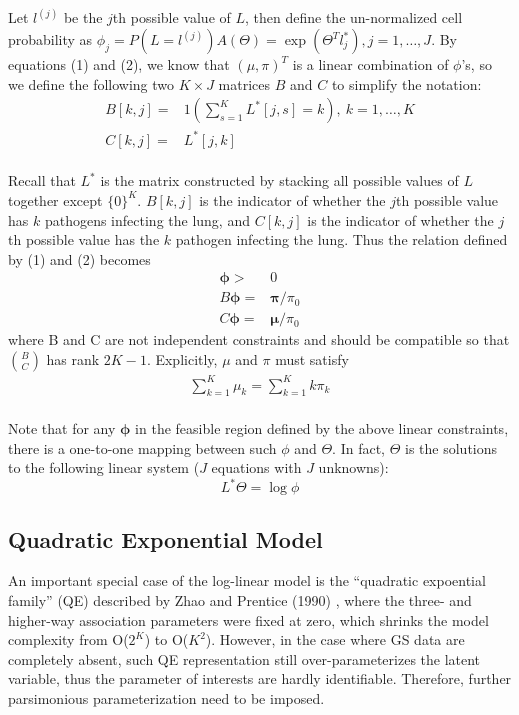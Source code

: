 \documentclass[11 pt, a4paper]{article}  %
\begin{document}
Let $l^{(j)}$ be the $j$th possible value of $L$, then define the un-normalized cell probability as $\phi_j = P(L=l^{(j)})A(\Theta) = \exp(\Theta^T l^*_j), j= 1, \ldots, J$. By equations (1) and (2), we know that $(\mu,\pi)^T$ is a linear combination of $\phi$'s, so we define the following two $K \times J$  matrices $B$ and $C$ to simplify the notation:
\begin{align*}
B[k,j] = & 1(\sum_{s=1}^K L^*[j,s]=k), \ k=1,\ldots,K \\
C[k,j] = & L^*[j,k]
\end{align*}
\\
Recall that $L^*$ is the matrix constructed by stacking all possible values of $L$ together except $\{0\}^K$. $B[k,j]$ is the indicator of whether the $j$th possible value has $k$ pathogens infecting the lung, and $C[k,j]$ is the indicator of whether the $j$th possible value has the $k$ pathogen infecting the lung. Thus the relation defined by (1) and (2) becomes
\begin{align}
\mathbf{\phi} > & 0\\
B \mathbf{\phi} = & \mathbf{\pi}/\pi_0\\ 
C \mathbf{\phi} = & \mathbf{\mu}/\pi_0
\end{align}
where B and C are not independent constraints and should be compatible so that $\binom{B}{C}$ has rank $2K-1$. Explicitly, $\mu$ and $\pi$ must satisfy 
\begin{align}
\sum_{k=1}^K \mu_k = \sum_{k=1}^K k\pi_k
\end{align} 
\\
Note that for any $\mathbf{\phi}$ in the feasible region defined by the above linear constraints, there is a one-to-one mapping between such $\phi$ and $\Theta$. In fact, $\Theta$ is the solutions to the following linear system ($J$ equations with $J$ unknowns):
\[L^*\Theta = \log \phi\]

\subsection{Quadratic Exponential Model}
An important special case of the log-linear model is the ``quadratic expoential family'' (QE) described by Zhao and Prentice (1990) \cite{zhao1990correlated}, where the three- and higher-way association parameters were fixed at zero, which shrinks the model complexity from O($2^K$) to O($K^2$). However, in the case where GS data are completely absent, such QE representation still over-parameterizes the latent variable, thus the parameter of interests are hardly identifiable. Therefore, further parsimonious parameterization need to be imposed.\\
\end{document}
